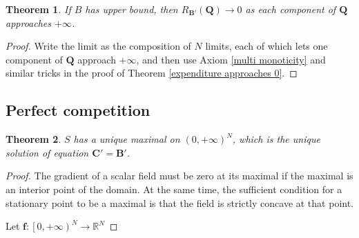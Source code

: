 \documentclass{article}
\newtheorem{theorem}{Theorem}[subsection]
\begin{document}
\begin{theorem}
If $B$ has upper bound, then $R_{\mathbf B'}\!\left(\mathbf Q\right)\to0$ as each component of $\mathbf Q$ approaches $+\infty$.
\end{theorem}
\begin{proof}
Write the limit as the composition of $N$ limits, each of which lets one component of $\mathbf Q$ approach $+\infty$,
and then use Axiom \ref{multi monoticity} and similar tricks in the proof of Theorem \ref{expenditure approaches 0}.
\end{proof}

\subsection{Perfect competition}

\begin{theorem}
$S$ has a unique maximal on $\left(0,+\infty\right)^N$,
which is the unique solution of equation $\mathbf C'=\mathbf B'$.
\end{theorem}
\begin{proof}
The gradient of a scalar field must be zero at its maximal if the maximal is an interior point of the domain.
At the same time, the sufficient condition for a stationary point to be a maximal is that the field is strictly concave at that point.

Let $\mathbf f:\left[0,+\infty\right)^N\to\mathbb R^N$
\end{proof}
\end{document}
